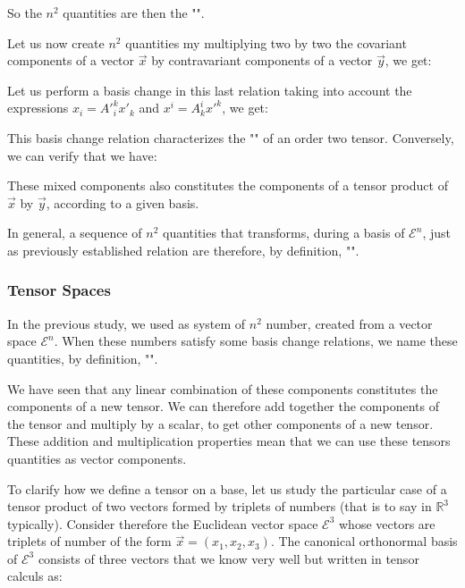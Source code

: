 	So the $n^2$ quantities are then the "".

	Let us now create $n^2$ quantities my multiplying two by two the covariant components of a vector $\vec{x}$ by contravariant components of a vector $\vec{y}$, we get:
	
	Let us perform a basis change in this last relation taking into account the expressions $x_i={A'}_i^k{x'}_k$ and $x^i={A}_k^i {x'}^k$, we get:
	
	This basis change relation characterizes the "" of an order two tensor. Conversely, we can verify that we have:
	
	These mixed components also constitutes the components of a tensor product of $\vec{x}$ by $\vec{y}$, according to a given basis.
	
	In general, a sequence of  $n^2$ quantities that transforms, during a basis of $\mathcal{E}^n$, just as previously established relation are therefore, by definition, "".
	
	\pagebreak
	\subsubsection{Tensor Spaces}
	In the previous study, we used as system of $n^2$ number, created from a vector space $\mathcal{E}^n$. When these numbers satisfy some basis change relations, we name these quantities, by definition, "".

	We have seen that any linear combination of these components constitutes the components of a new tensor. We can therefore add together the components of the tensor and multiply by a scalar, to get other components of a new tensor. These addition and multiplication properties mean that we can use these tensors quantities as vector components.
	
	To clarify how we define a tensor on a base, let us study the particular case of a tensor product of two vectors formed by triplets of numbers (that is to say in $\mathbb{R}^3$ typically). Consider therefore the Euclidean vector space $\mathcal{E}^3$ whose vectors are triplets of number of the form $\vec{x}=(x_1,x_2,x_3)$. The canonical orthonormal basis of $\mathcal{E}^3$ consists of three vectors that we know very well but written in tensor calculs as:
	
